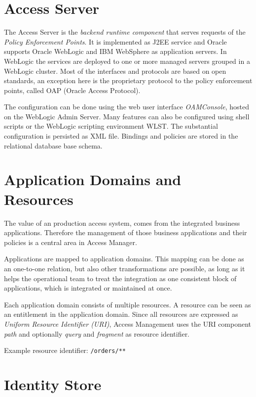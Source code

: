 \section{Access Server}

The Access Server is the \emph{backend runtime component} that serves
requests of the \emph{Policy Enforcement Points}. It is implemented as
J2EE service and Oracle supports Oracle WebLogic and IBM WebSphere as
application servers. In WebLogic the services are deployed to one or
more managed servers grouped in a WebLogic cluster.  Most of the
interfaces and protocols are based on open standards, an exception here
is the proprietary protocol to the policy enforcement points, called OAP
(Oracle Access Protocol).

The configuration can be done using the web user interface 
\emph{OAMConsole}, hosted on the WebLogic Admin Server. Many features
can also be configured using shell scripts or the WebLogic scripting
environment WLST\@. The substantial configuration is persisted as XML
file. Bindings and policies are stored in the relational database base
schema.


\section{Application Domains and Resources}

The value of an production access system, comes from the integrated
business applications. Therefore the management of those business
applications and their policies is a central area in Access Manager.

Applications are mapped to application domains. This mapping can be done  
as an one-to-one relation, but also other transformations are possible,
as long as it helps the operational team to treat the integration as one
consistent block of applications, which is integrated or maintained at
once.

Each application domain consists of multiple resources. A resource can
be seen as an entitlement in the application domain. Since all resources
are expressed as \emph{Uniform Resource Identifier (URI)}, Access
Management uses the URI component \emph{path} and optionally \emph{query} and
\emph{fragment} as resource identifier.

Example resource identifier: \verb|/orders/**|



\section{Identity Store}

